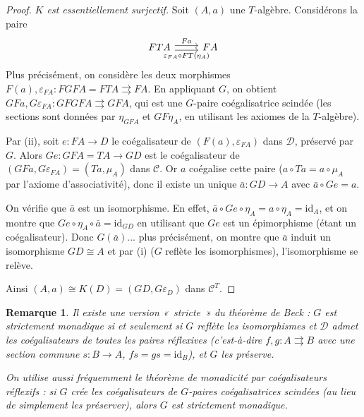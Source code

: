 \documentclass[a4paper,12pt]{book}
\newcommand{\id}{\mathrm{id}}
\newtheorem*{remarque}{Remarque}
\begin{document}
\begin{proof}
\emph{$K$ est essentiellement surjectif.}
Soit $(A, a)$ une $T$-algèbre. Considérons la paire
\[
\begin{tikzcd}
FTA \arrow[r, shift left, "Fa"] \arrow[r, shift right, "\varepsilon_{FA} \circ FT(\eta_A)"'] &
FA
\end{tikzcd}
\]
Plus précisément, on considère les deux morphismes
$F(a), \varepsilon_{FA} \colon FGFA = FTA \rightrightarrows FA$.
En appliquant $G$, on obtient $GFa, G\varepsilon_{FA} \colon
GFGFA \rightrightarrows GFA$, qui est une $G$-paire coégalisatrice
scindée (les sections sont données par $\eta_{GFA}$ et $GF\eta_A$,
en utilisant les axiomes de la $T$-algèbre).

Par (ii), soit $e \colon FA \to D$ le coégalisateur de
$(F(a), \varepsilon_{FA})$ dans $\mathcal{D}$, préservé par $G$.
Alors $Ge \colon GFA = TA \to GD$ est le coégalisateur de
$(GFa, G\varepsilon_{FA}) = (Ta, \mu_A)$ dans $\mathcal{C}$.
Or $a$ coégalise cette paire ($a \circ Ta = a \circ \mu_A$
par l'axiome d'associativité), donc il existe un unique
$\bar{a} \colon GD \to A$ avec $\bar{a} \circ Ge = a$.

On vérifie que $\bar{a}$ est un isomorphisme.
En effet, $\bar{a} \circ Ge \circ \eta_A = a \circ \eta_A = \id_A$,
et on montre que $Ge \circ \eta_A \circ \bar{a} = \id_{GD}$
en utilisant que $Ge$ est un épimorphisme (étant un coégalisateur).
Donc $G(\bar{a})$... plus précisément, on montre que $\bar{a}$ induit
un isomorphisme $GD \cong A$ et par (i) ($G$ reflète les isomorphismes),
l'isomorphisme se relève.

Ainsi $(A, a) \cong K(D) = (GD, G\varepsilon_D)$ dans $\mathcal{C}^T$.
\end{proof}

\begin{remarque}\label{rem:beck-versions}
Il existe une version «~stricte~» du théorème de Beck :
$G$ est \emph{strictement} monadique si et seulement si
$G$ reflète les isomorphismes et $\mathcal{D}$ admet les
coégalisateurs de \emph{toutes} les paires réflexives
(c'est-à-dire $f, g \colon A \rightrightarrows B$ avec une section
commune $s \colon B \to A$, $fs = gs = \id_B$), et $G$ les préserve.

On utilise aussi fréquemment le \emph{théorème de monadicité par
coégalisateurs réflexifs} :
si $G$ crée les coégalisateurs de $G$-paires coégalisatrices scindées
(au lieu de simplement les préserver), alors $G$ est strictement monadique.
\end{remarque}
\end{document}
